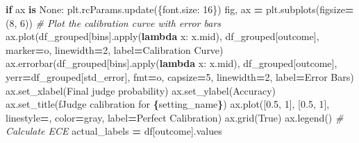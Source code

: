 \documentclass[
]{article}
\newenvironment{Shaded}{\begin{snugshade}}{\end{snugshade}}
\newcommand{\BuiltInTok}[1]{#1}
\newcommand{\CommentTok}[1]{\textcolor[rgb]{0.56,0.35,0.01}{\textit{#1}}}
\newcommand{\ControlFlowTok}[1]{\textcolor[rgb]{0.13,0.29,0.53}{\textbf{#1}}}
\newcommand{\DecValTok}[1]{\textcolor[rgb]{0.00,0.00,0.81}{#1}}
\newcommand{\FloatTok}[1]{\textcolor[rgb]{0.00,0.00,0.81}{#1}}
\newcommand{\KeywordTok}[1]{\textcolor[rgb]{0.13,0.29,0.53}{\textbf{#1}}}
\newcommand{\NormalTok}[1]{#1}
\newcommand{\OperatorTok}[1]{\textcolor[rgb]{0.81,0.36,0.00}{\textbf{#1}}}
\newcommand{\SpecialCharTok}[1]{\textcolor[rgb]{0.81,0.36,0.00}{\textbf{#1}}}
\newcommand{\SpecialStringTok}[1]{\textcolor[rgb]{0.31,0.60,0.02}{#1}}
\newcommand{\StringTok}[1]{\textcolor[rgb]{0.31,0.60,0.02}{#1}}
\newcommand{\VariableTok}[1]{\textcolor[rgb]{0.00,0.00,0.00}{#1}}
\begin{document}
\begin{Shaded}
\begin{Highlighting}[]
    \ControlFlowTok{if}\NormalTok{ ax }\KeywordTok{is} \VariableTok{None}\NormalTok{:}
\NormalTok{        plt.rcParams.update(\{}\StringTok{\textquotesingle{}font.size\textquotesingle{}}\NormalTok{: }\DecValTok{16}\NormalTok{\})}
\NormalTok{        fig, ax }\OperatorTok{=}\NormalTok{ plt.subplots(figsize}\OperatorTok{=}\NormalTok{(}\DecValTok{8}\NormalTok{, }\DecValTok{6}\NormalTok{))}
    \CommentTok{\# Plot the calibration curve with error bars}
\NormalTok{    ax.plot(df\_grouped[}\StringTok{\textquotesingle{}bins\textquotesingle{}}\NormalTok{].}\BuiltInTok{apply}\NormalTok{(}\KeywordTok{lambda}\NormalTok{ x: x.mid), df\_grouped[}\StringTok{\textquotesingle{}outcome\textquotesingle{}}\NormalTok{], marker}\OperatorTok{=}\StringTok{\textquotesingle{}o\textquotesingle{}}\NormalTok{, linewidth}\OperatorTok{=}\DecValTok{2}\NormalTok{, label}\OperatorTok{=}\StringTok{\textquotesingle{}Calibration Curve\textquotesingle{}}\NormalTok{)}
\NormalTok{    ax.errorbar(df\_grouped[}\StringTok{\textquotesingle{}bins\textquotesingle{}}\NormalTok{].}\BuiltInTok{apply}\NormalTok{(}\KeywordTok{lambda}\NormalTok{ x: x.mid), df\_grouped[}\StringTok{\textquotesingle{}outcome\textquotesingle{}}\NormalTok{], yerr}\OperatorTok{=}\NormalTok{df\_grouped[}\StringTok{\textquotesingle{}std\_error\textquotesingle{}}\NormalTok{], fmt}\OperatorTok{=}\StringTok{\textquotesingle{}o\textquotesingle{}}\NormalTok{, capsize}\OperatorTok{=}\DecValTok{5}\NormalTok{, linewidth}\OperatorTok{=}\DecValTok{2}\NormalTok{, label}\OperatorTok{=}\StringTok{\textquotesingle{}Error Bars\textquotesingle{}}\NormalTok{)}
\NormalTok{    ax.set\_xlabel(}\StringTok{\textquotesingle{}Final judge probability\textquotesingle{}}\NormalTok{)}
\NormalTok{    ax.set\_ylabel(}\StringTok{\textquotesingle{}Accuracy\textquotesingle{}}\NormalTok{)}
\NormalTok{    ax.set\_title(}\SpecialStringTok{f\textquotesingle{}Judge calibration for }\SpecialCharTok{\{}\NormalTok{setting\_name}\SpecialCharTok{\}}\SpecialStringTok{\textquotesingle{}}\NormalTok{)}
\NormalTok{    ax.plot([}\FloatTok{0.5}\NormalTok{, }\DecValTok{1}\NormalTok{], [}\FloatTok{0.5}\NormalTok{, }\DecValTok{1}\NormalTok{], linestyle}\OperatorTok{=}\StringTok{\textquotesingle{}{-}{-}\textquotesingle{}}\NormalTok{, color}\OperatorTok{=}\StringTok{\textquotesingle{}gray\textquotesingle{}}\NormalTok{, label}\OperatorTok{=}\StringTok{\textquotesingle{}Perfect Calibration\textquotesingle{}}\NormalTok{)}
\NormalTok{    ax.grid(}\VariableTok{True}\NormalTok{)}
\NormalTok{    ax.legend()}
    \CommentTok{\# Calculate ECE}
\NormalTok{    actual\_labels }\OperatorTok{=}\NormalTok{ df[}\StringTok{\textquotesingle{}outcome\textquotesingle{}}\NormalTok{].values}

\end{Highlighting}
\end{Shaded}
\end{document}
